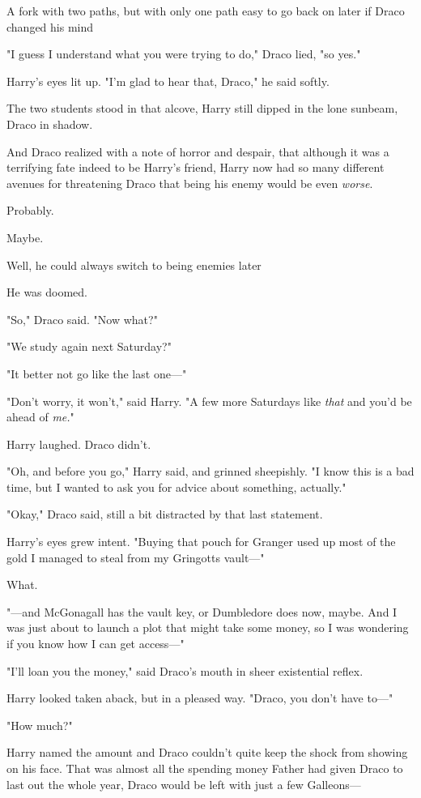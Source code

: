 A fork with two paths, but with only one path easy to go back on later if Draco
changed his mind{\el}

"I guess I understand what you were trying to do," Draco lied, "so yes."

Harry's eyes lit up. "I'm glad to hear that, Draco," he said softly.

The two students stood in that alcove, Harry still dipped in the lone sunbeam,
Draco in shadow.

And Draco realized with a note of horror and despair, that although it was a
terrifying fate indeed to be Harry's friend, Harry now had so many different
avenues for threatening Draco that being his enemy would be even \emph{worse}.

Probably.

Maybe.

Well, he could always switch to being enemies later{\el}

He was doomed.

"So," Draco said. "Now what?"

"We study again next Saturday?"

"It better not go like the last one\mbox{---}"

"Don't worry, it won't," said Harry. "A few more Saturdays like \emph{that} and
you'd be ahead of \emph{me.}"

Harry laughed. Draco didn't.

"Oh, and before you go," Harry said, and grinned sheepishly. "I know this is a
bad time, but I wanted to ask you for advice about something, actually."

"Okay," Draco said, still a bit distracted by that last statement.

Harry's eyes grew intent. "Buying that pouch for Granger used up most of the
gold I managed to steal from my Gringotts vault\mbox{---}"

What.

"---and McGonagall has the vault key, or Dumbledore does now, maybe. And I was
just about to launch a plot that might take some money, so I was wondering if
you know how I can get access\mbox{---}"

"I'll loan you the money," said Draco's mouth in sheer existential reflex.

Harry looked taken aback, but in a pleased way. "Draco, you don't have to\mbox{---}"

"How much?"

Harry named the amount and Draco couldn't quite keep the shock from showing on
his face. That was almost all the spending money Father had given Draco to last
out the whole year, Draco would be left with just a few Galleons---

